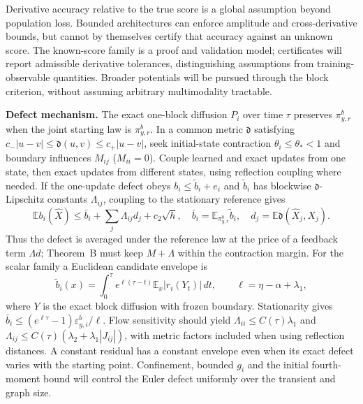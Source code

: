 \documentclass[12pt,a4paper]{article}
\newcommand{\E}{\mathbb E}
\newcommand{\pir}{\pi_{y,r}^{b}}
\begin{document}
Derivative accuracy relative to the true score is a global assumption beyond population loss. Bounded architectures can enforce amplitude and cross-derivative bounds, but cannot by themselves certify that accuracy against an unknown score. The known-score family is a proof and validation model; certificates will report admissible derivative tolerances, distinguishing assumptions from training-observable quantities. Broader potentials will be pursued through the block criterion, without assuming arbitrary multimodality tractable.

\textbf{Defect mechanism.} The exact one-block diffusion $P_i$ over time $\tau$ preserves $\pir$ when the joint starting law is $\pir$. In a common metric $\mathfrak d$ satisfying $c_-|u-v|\leq\mathfrak d(u,v)\leq c_+|u-v|$, seek initial-state contraction $\theta_i\leq\theta_*<1$ and boundary influences $M_{ij}$ ($M_{ii}=0$). Couple learned and exact updates from one state, then exact updates from different states, using reflection coupling where needed. If the one-update defect obeys $b_i\leq\widetilde b_i+e_i$ and $\widetilde b_i$ has blockwise $\mathfrak d$-Lipschitz constants $\Lambda_{ij}$, coupling to the stationary reference gives
\[
 \E b_i(\widehat X)\leq\bar b_i+\sum_j\Lambda_{ij}d_j+c_2\sqrt h,
 \quad \bar b_i=\E_{\pir}\widetilde b_i,\quad d_j=\E\mathfrak d(\widehat X_j,X_j).
\]
Thus the defect is averaged under the reference law at the price of a feedback term $\Lambda d$; Theorem~B must keep $M+\Lambda$ within the contraction margin.
For the scalar family a Euclidean candidate envelope is
\begin{equation}\label{eq:defect}
 \widetilde b_i(x)=\int_0^\tau e^{\ell(\tau-t)}\E_x|r_i(Y_t)|\,dt,
 \qquad \ell=\eta-\alpha+\lambda_1,
\end{equation}
where $Y$ is the exact block diffusion with frozen boundary. Stationarity gives $\bar b_i\leq(e^{\ell\tau}-1)\varepsilon^b_{y,i}/\ell$. Flow sensitivity should yield $\Lambda_{ii}\leq C(\tau)\lambda_1$ and $\Lambda_{ij}\leq C(\tau)(\lambda_2+\lambda_1|J_{ij}|)$, with metric factors included when using reflection distances. A constant residual has a constant envelope even when its exact defect varies with the starting point. Confinement, bounded $g_i$ and the initial fourth-moment bound will control the Euler defect uniformly over the transient and graph size.
\end{document}
